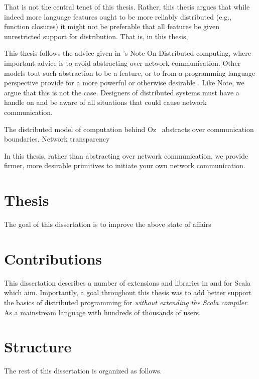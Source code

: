 That is not the central tenet of this thesis. Rather, this thesis argues that
while indeed more language features ought to be more reliably distributed (e.g.,
function closures) it might not be preferable that all features be given
unrestricted support for distribution. That is, in this thesis,

This thesis follows the advice given in 's Note On Distributed computing, where
important advice is to avoid abstracting over network communication. Other
models tout such abstraction to be a feature, or to from a programming language
perspective provide for a more powerful or otherwise desirable . Like Note, we
argue that this is not the case. Designers of distributed systems must have a
handle on and be aware of all situations that could cause network communication.

The distributed model of computation behind Oz~\cite{DistributedOz} abstracts
over communication boundaries. Network transparency
~\cite{ConceptsTechniquesModelsProgramming}

In this thesis, rather than abstracting over network communication, we provide
firmer, more desirable primitives to initiate your own network communication.


\section{Thesis}
The goal of this dissertation is to improve the above state of affairs

\section{Contributions}

This dissertation describes a number of extensions and libraries in and for
Scala which aim. Importantly, a goal throughout this thesis was to add better support the basics of distributed programming for {\em without extending the Scala compiler}. As a mainstream language with hundreds of thousands of users.

\section{Structure}

The rest of this dissertation is organized as follows.


